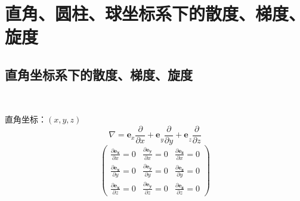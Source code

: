 \documentclass[UTF8]{ctexart}
\newcommand{\tmmathbf}[1]{\ensuremath{\boldsymbol{#1}}}
\begin{document}
\section{直角、圆柱、球坐标系下的散度、梯度、旋度}

\subsection{直角坐标系下的散度、梯度、旋度}

\

直角坐标：$(x, y, z)$
\begin{equation}
  \nabla = \tmmathbf{e}_x \tmmathbf{} \frac{\partial}{\partial x} +
  \tmmathbf{e_{}}_y \frac{\partial}{\partial y} + \tmmathbf{e_{}}_z
  \frac{\partial}{\partial z}
\end{equation}
\begin{equation}
  \left(\begin{array}{ccc}
    \frac{\partial \tmmathbf{e_x}}{\partial x} = 0 & \frac{\partial
    \tmmathbf{e_y}}{\partial x} = 0 & \frac{\partial \tmmathbf{e_z}}{\partial
    x} = 0\\
    \frac{\partial \tmmathbf{e_x}}{\partial y} = 0 & \frac{\partial
    \tmmathbf{e_y}}{\partial y} = 0 & \frac{\partial \tmmathbf{e_z}}{\partial
    y} = 0\\
    \frac{\partial \tmmathbf{e_x}}{\partial z} = 0 & \frac{\partial
    \tmmathbf{e_y}}{\partial z} = 0 & \frac{\partial \tmmathbf{e_z}}{\partial
    z} = 0
  \end{array}\right)
\end{equation}
\end{document}
